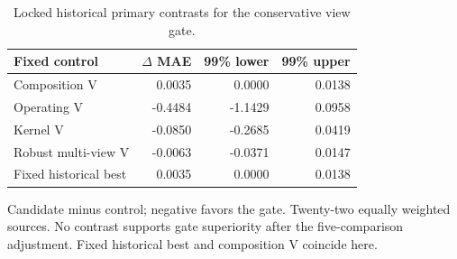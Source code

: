 \begin{table}[htbp]\centering\small
\caption{Locked historical primary contrasts for the conservative view gate.}\label{tab:step9primary}
\begin{tabular}{lrrr}\toprule Fixed control & $\Delta$ MAE & 99\% lower & 99\% upper \\ \midrule
Composition V & 0.0035 & 0.0000 & 0.0138 \\
Operating V & -0.4484 & -1.1429 & 0.0958 \\
Kernel V & -0.0850 & -0.2685 & 0.0419 \\
Robust multi-view V & -0.0063 & -0.0371 & 0.0147 \\
Fixed historical best & 0.0035 & 0.0000 & 0.0138 \\
\bottomrule\end{tabular}\par\smallskip\footnotesize Candidate minus control; negative favors the gate. Twenty-two equally weighted sources. No contrast supports gate superiority after the five-comparison adjustment. Fixed historical best and composition V coincide here.\end{table}
